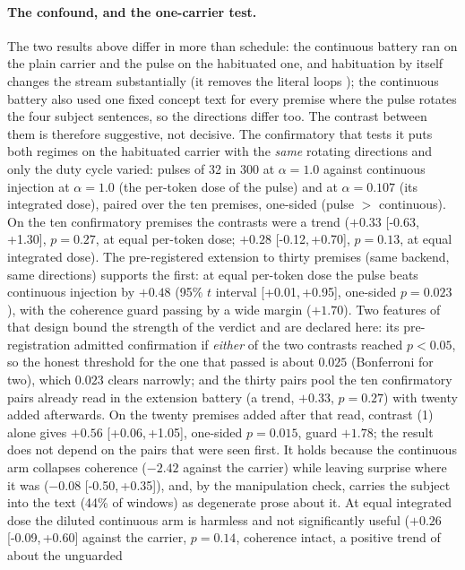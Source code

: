 \documentclass[11pt]{article}
\newcommand{\ci}[2]{[#1,\,#2]}
\begin{document}
\paragraph{The confound, and the one-carrier test.} The two results
above differ in more than schedule: the continuous battery ran on the
plain carrier and the pulse on the habituated one, and habituation by
itself changes the stream substantially (it removes the literal loops
\citep{ono2026interrupting}); the continuous
battery also used one fixed concept text for every premise where the
pulse rotates the four subject sentences, so the directions differ too.
The contrast between them is therefore suggestive, not decisive. The confirmatory
that tests it puts both regimes on the habituated carrier with the
\emph{same} rotating directions and only the duty cycle varied: pulses
of 32 in 300 at $\alpha=1.0$ against continuous injection at
$\alpha=1.0$ (the per-token dose of the pulse) and at $\alpha=0.107$
(its integrated dose), paired over the ten premises, one-sided
(pulse $>$ continuous). On the ten confirmatory premises the contrasts were a trend ($+0.33$
\ci{-0.63}{+1.30}, $p=0.27$, at equal per-token dose; $+0.28$
\ci{-0.12}{+0.70}, $p=0.13$, at equal integrated dose). The
pre-registered extension to thirty premises (same backend, same
directions) supports the first: at equal per-token dose the pulse beats
continuous injection by $+0.48$ (95\% $t$ interval \ci{+0.01}{+0.95},
one-sided $p=0.023$), with the coherence guard passing by a wide margin
($+1.70$). Two features of that design bound the strength of the
verdict and are declared here: its pre-registration admitted
confirmation if \emph{either} of the two contrasts reached $p<0.05$, so
the honest threshold for the one that passed is about $0.025$
(Bonferroni for two), which $0.023$ clears narrowly; and the thirty
pairs pool the ten confirmatory pairs already read in the extension
battery (a trend, $+0.33$, $p=0.27$) with twenty added afterwards. On
the twenty premises added after that read, contrast (1) alone gives
$+0.56$ \ci{+0.06}{+1.05}, one-sided $p=0.015$, guard $+1.78$; the result
does not depend on the pairs that were seen first. It holds because the
continuous arm collapses coherence ($-2.42$
against the carrier) while leaving surprise where it was ($-0.08$
\ci{-0.50}{+0.35}), and, by the manipulation check, carries the subject
into the text (44\% of windows) as degenerate prose about it. At equal
integrated dose the diluted continuous arm is harmless and not
significantly useful ($+0.26$ \ci{-0.09}{+0.60} against the carrier,
$p=0.14$, coherence intact, a positive trend of about the unguarded
\end{document}
